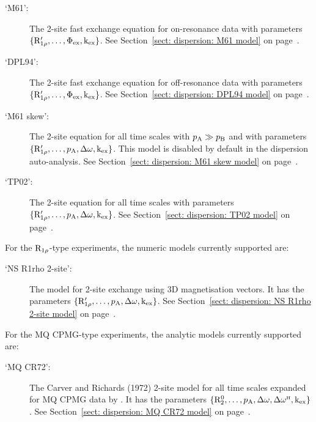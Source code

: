 \begin{description}
\item[`M61':]  The \citet{Meiboom61} 2-site fast exchange equation for on-resonance data with parameters $\{\mathrm{R}_{1\rho}', \dots, \Phi_\textrm{ex}, \textrm{k}_\textrm{ex}\}$.  See Section~\ref{sect: dispersion: M61 model} on page~\pageref{sect: dispersion: M61 model}.
\item[`DPL94':]  The \citet{Davis94} 2-site fast exchange equation for off-resonance data with parameters $\{\mathrm{R}_{1\rho}', \dots, \Phi_\textrm{ex}, \textrm{k}_\textrm{ex}\}$.  See Section~\ref{sect: dispersion: DPL94 model} on page~\pageref{sect: dispersion: DPL94 model}.
\item[`M61 skew':]  The \citet{Meiboom61} 2-site equation for all time scales with $p_\textrm{A} \gg p_\textrm{B}$ and with parameters $\{\mathrm{R}_{1\rho}', \dots, p_\textrm{A}, \Delta\omega, \textrm{k}_\textrm{ex}\}$.  This model is disabled by default in the dispersion auto-analysis.  See Section~\ref{sect: dispersion: M61 skew model} on page~\pageref{sect: dispersion: M61 skew model}.
\item[`TP02':]  The \citet{TrottPalmer02} 2-site equation for all time scales with parameters $\{\mathrm{R}_{1\rho}', \dots, p_\textrm{A}, \Delta\omega, \textrm{k}_\textrm{ex}\}$.  See Section~\ref{sect: dispersion: TP02 model} on page~\pageref{sect: dispersion: TP02 model}.
\end{description}


For the $\mathrm{R}_{1\rho}$-type experiments, the numeric models currently supported are:

\begin{description}
\item[`NS R1rho 2-site':]  The model for 2-site exchange using 3D magnetisation vectors.  It has the parameters $\{\mathrm{R}_{1\rho}', \dots, p_\textrm{A}, \Delta\omega, \textrm{k}_\textrm{ex}\}$.  See Section~\ref{sect: dispersion: NS R1rho 2-site model} on page~\pageref{sect: dispersion: NS R1rho 2-site model}.
\end{description}


For the MQ CPMG-type experiments, the analytic models currently supported are:

\begin{description}
\item[`MQ CR72':]  The Carver and Richards (1972) 2-site model for all time scales expanded for MQ CPMG data by \citet{Korzhnev04a}.  It has the parameters $\{\mathrm{R}_2^0, \dots, p_\textrm{A}, \Delta\omega, \Delta\omega^{\scriptscriptstyle\mathrm{H}}, \textrm{k}_\textrm{ex}\}$.  See Section~\ref{sect: dispersion: MQ CR72 model} on page~\pageref{sect: dispersion: MQ CR72 model}.
\end{description}


